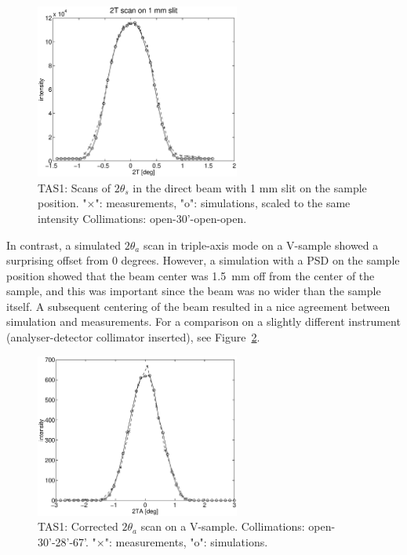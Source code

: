 \begin{figure}
  \begin{center}
    \includegraphics[width=0.6\textwidth]{figures/tas1-2T.eps}
  \end{center}
\caption{TAS1: Scans of $2\theta_s$ in the direct beam with 1 mm slit on the
  sample position.
"$\times$": measurements, "o": simulations, scaled to the same intensity
Collimations: open-30'-open-open.}
\label{f:2t_direct}
\end{figure}

In contrast, a simulated $2\theta_a$ scan in triple-axis
mode on a V-sample showed a surprising offset from 0 degrees.
However, a simulation with a PSD
on the sample position showed that the beam center was 1.5~mm
off from the center of the sample, and this was important
since the beam was no wider than the sample itself.
A subsequent centering of the beam resulted in a nice
agreement between simulation and measurements.
For a comparison on a slightly different instrument
(analyser-detector collimator inserted),
see Figure~\ref{f:v_2ta_zero}.


\begin{figure}
  \begin{center}
    \includegraphics[width=0.6\textwidth]{figures/vanadium-plot-2.eps}
  \end{center}
\caption{TAS1: Corrected $2\theta_a$ scan on a V-sample.
Collimations: open-30'-28'-67'.
"$\times$": measurements, "o": simulations.}
\label{f:v_2ta_zero}
\end{figure}

